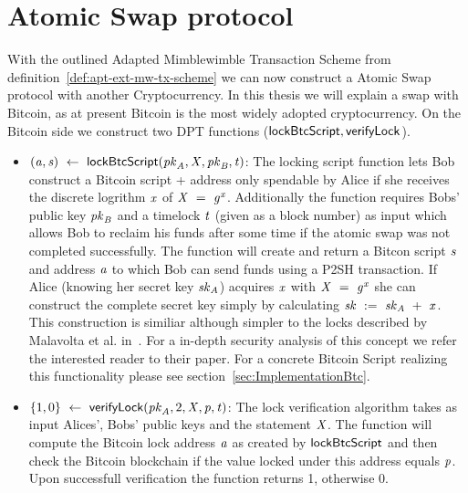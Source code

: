 \section{Atomic Swap protocol}\label{sec:atomic-swap}

With the outlined Adapted Mimblewimble Transaction Scheme from definition~\ref{def:apt-ext-mw-tx-scheme} we can now construct a Atomic Swap protocol with another Cryptocurrency.
In this thesis we will explain a swap with Bitcoin, as at present Bitcoin is the most widely adopted cryptocurrency. On the Bitcoin side we construct two
DPT functions ($\mathsf{lockBtcScript}, \mathsf{verifyLock}$).
\begin{itemize}
    \item $(\mathit{a}, \mathit{s}) ~\leftarrow~ \mathsf{lockBtcScript} (\mathit{pk}_{\mathit{A}},\mathit{X},\mathit{pk}_{\mathit{B}},\mathit{t})$: The locking script function lets Bob construct
    a Bitcoin script + address only spendable by Alice if she receives the discrete logrithm $\mathit{x}$ of $\mathit{X} ~=~ \mathit{g}^{\mathit{x}}$.
    Additionally the function requires Bobs' public key
    $\mathit{pk}_{\mathit{B}}$ and a timelock $\mathit{t}$ (given as a block number) as input which allows Bob to reclaim his funds after some time if the atomic swap was not
    completed successfully. The function will create and return a Bitcon script $\mathit{s}$ and address $\mathit{a}$ to which Bob can send funds using a P2SH transaction.
    If Alice (knowing her secret key $\mathit{sk}_{\mathit{A}}$) acquires $\mathit{x}$ with $\mathit{X} ~=~ \mathit{g}^{\mathit{x}}$ she can construct the complete secret key simply
    by calculating $\mathit{sk} ~:=~ \mathit{sk}_{\mathit{A}} ~+~ \mathit{x}$. This construction is similiar although simpler to the locks described
    by Malavolta et al. in~\cite{malavolta2019anonymous}. For a in-depth security analysis of this concept we refer the interested reader to their paper. For
    a concrete Bitcoin Script realizing this functionality please see section~\ref{sec:ImplementationBtc}.
    \item $\{ 1,0 \} ~\leftarrow~ \mathsf{verifyLock} (\mathit{pk}_{\mathit{A}},2,\mathit{X},\mathit{p},\mathit{t})$: The lock verification algorithm takes as input Alices',
    Bobs' public keys and the statement $\mathit{X}$. The function will compute the Bitcoin lock address $\mathit{a}$ as created by
    $\mathsf{lockBtcScript}$ and then check the Bitcoin blockchain if the value locked under this address equals $\mathit{p}$. Upon successfull verification
    the function returns 1, otherwise 0.
\end{itemize}
